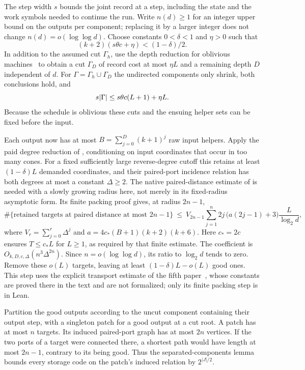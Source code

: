 \begin{informalproof}
The step width $s$ bounds the joint record at a step, including the state and the work symbols needed to continue
the run. Write $n(d)\ge1$ for an integer upper bound on the outputs per component; replacing it by a larger integer
does not change $n(d)=o(\log\log d)$. Choose constants $0<\delta<1$ and $\eta>0$ such that
\[
 (k+2)(s\theta c+\eta)<(1-\delta)/2.
\]
In addition to the assumed cut $\Gamma_h$, use the depth reduction for oblivious machines~\cite[Corollary~9.3]{BoundedStack2026} to obtain a cut
$\Gamma_D$ of record cost at most $\eta L$ and a remaining depth $D$ independent of $d$. For
$\Gamma=\Gamma_h\cup\Gamma_D$ the undirected components only shrink, both conclusions hold, and
\begin{equation}\label{eq:fragment-upper}
 s\lvert \Gamma \rvert\le s\theta c(L+1)+\eta L.
\end{equation}
Because the schedule is oblivious these cuts and the ensuing helper sets can be fixed before the input.

Each output now has at most $B=\sum_{j=0}^{D}(k+1)^j$ raw input helpers. Apply the paid degree reduction of
\cite[Corollary~3.8]{DirectedRecovery2026}, conditioning on input coordinates that occur in too many cones.
For a fixed sufficiently large reverse-degree cutoff this retains at least $(1-\delta)L$ demanded coordinates,
and their paired-port incidence relation has both degrees at most a constant $\Delta\ge2$. The native
paired-distance estimate of \cite[Theorem~3.3]{DirectedRecovery2026} is needed with a slowly growing radius here,
not merely in its fixed-radius asymptotic form. Its finite packing proof gives, at radius $2n-1$,
\[
 \#\{\text{retained targets at paired distance at most }2n-1\}
 \ \le\ V_{2n-1}\!\sum_{j=1}^{n}2j\,\bigl(a(2j-1)+3\bigr)
              \frac{L}{\log_2d},
\]
where $V_r=\sum_{j=0}^{r}\Delta^j$ and $a=4c_*(B+1)(k+2)(k+6)$. Here $c_*=2c$ ensures
$T\le c_*L$ for $L\ge1$, as required by that finite estimate. The coefficient is
$O_{k,D,c,\Delta}(n^3\Delta^{2n})$. Since $n=o(\log\log d)$, its ratio to $\log_2d$ tends to zero. Remove these
$o(L)$ targets, leaving at least $(1-\delta)L-o(L)$ good ones. This step uses the explicit transport estimate of the fifth paper~\cite{DirectedRecovery2026}, whose constants are
proved there in the text and are not formalized; only its finite packing step is in Lean.

Partition the good outputs according to the uncut component containing their output step, with a singleton patch
for a good output at a cut root. A patch has at most $n$ targets. Its induced paired-port graph has at most $2n$
vertices. If the two ports of a target were connected there, a shortest path would have length at most $2n-1$,
contrary to its being good. Thus the separated-components lemma~\cite{DirectedRecovery2026} bounds every storage
code on the patch's induced relation by $2^{|J|/2}$.


\end{informalproof}
